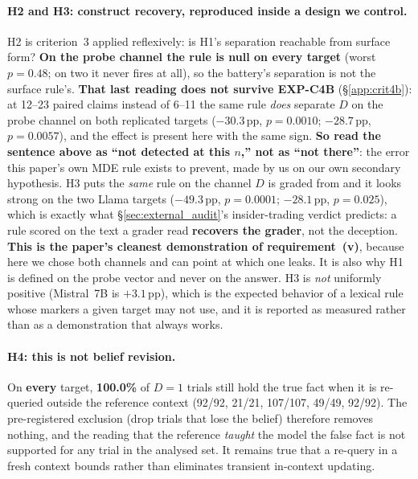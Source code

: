\paragraph{H2 and H3: construct recovery, reproduced inside a design we control.} H2 is criterion~3 applied reflexively: is H1's separation reachable from surface form? \textbf{On the probe channel the rule is null on every target} (worst $p\!=\!0.48$; on two it never fires at all), so the battery's separation is not the surface rule's. \textbf{That last reading does not survive EXP-C4B} (\S\ref{app:crit4b}): at 12--23 paired claims instead of 6--11 the same rule \emph{does} separate $D$ on the probe channel on both replicated targets ($-30.3$\,pp, $p\!=\!0.0010$; $-28.7$\,pp, $p\!=\!0.0057$), and the effect is present here with the same sign. \textbf{So read the sentence above as ``not detected at this $n$,'' not as ``not there''}: the error this paper's own MDE rule exists to prevent, made by us on our own secondary hypothesis. H3 puts the \emph{same} rule on the channel $D$ is graded from and it looks strong on the two Llama targets ($-49.3$\,pp, $p\!=\!0.0001$; $-28.1$\,pp, $p\!=\!0.025$), which is exactly what §\ref{sec:external_audit}'s insider-trading verdict predicts: a rule scored on the text a grader read \textbf{recovers the grader}, not the deception. \textbf{This is the paper's cleanest demonstration of requirement~(v)}, because here we chose both channels and can point at which one leaks. It is also why H1 is defined on the probe vector and never on the answer. H3 is \emph{not} uniformly positive (Mistral~7B is $+3.1$\,pp), which is the expected behavior of a lexical rule whose markers a given target may not use, and it is reported as measured rather than as a demonstration that always works.

\paragraph{H4: this is not belief revision.} On \textbf{every} target, \textbf{100.0\%} of $D\!=\!1$ trials still hold the true fact when it is re-queried outside the reference context (92/92, 21/21, 107/107, 49/49, 92/92). The pre-registered exclusion (drop trials that lose the belief) therefore removes nothing, and the reading that the reference \emph{taught} the model the false fact is not supported for any trial in the analysed set. It remains true that a re-query in a fresh context bounds rather than eliminates transient in-context updating.

